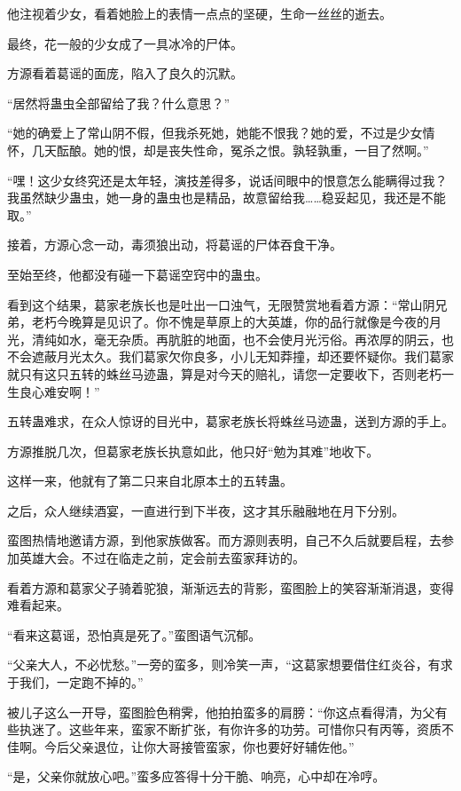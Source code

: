 \begin{this_body}
他注视着少女，看着她脸上的表情一点点的坚硬，生命一丝丝的逝去。

最终，花一般的少女成了一具冰冷的尸体。

方源看着葛谣的面庞，陷入了良久的沉默。

“居然将蛊虫全部留给了我？什么意思？”

“她的确爱上了常山阴不假，但我杀死她，她能不恨我？她的爱，不过是少女情怀，几天酝酿。她的恨，却是丧失性命，冤杀之恨。孰轻孰重，一目了然啊。”

“嘿！这少女终究还是太年轻，演技差得多，说话间眼中的恨意怎么能瞒得过我？我虽然缺少蛊虫，她一身的蛊虫也是精品，故意留给我……稳妥起见，我还是不能取。”

接着，方源心念一动，毒须狼出动，将葛谣的尸体吞食干净。

至始至终，他都没有碰一下葛谣空窍中的蛊虫。

看到这个结果，葛家老族长也是吐出一口浊气，无限赞赏地看着方源：“常山阴兄弟，老朽今晚算是见识了。你不愧是草原上的大英雄，你的品行就像是今夜的月光，清纯如水，毫无杂质。再肮脏的地面，也不会使月光污俗。再浓厚的阴云，也不会遮蔽月光太久。我们葛家欠你良多，小儿无知莽撞，却还要怀疑你。我们葛家就只有这只五转的蛛丝马迹蛊，算是对今天的赔礼，请您一定要收下，否则老朽一生良心难安啊！”

五转蛊难求，在众人惊讶的目光中，葛家老族长将蛛丝马迹蛊，送到方源的手上。

方源推脱几次，但葛家老族长执意如此，他只好“勉为其难”地收下。

这样一来，他就有了第二只来自北原本土的五转蛊。

之后，众人继续酒宴，一直进行到下半夜，这才其乐融融地在月下分别。

蛮图热情地邀请方源，到他家族做客。而方源则表明，自己不久后就要启程，去参加英雄大会。不过在临走之前，定会前去蛮家拜访的。

看着方源和葛家父子骑着驼狼，渐渐远去的背影，蛮图脸上的笑容渐渐消退，变得难看起来。

“看来这葛谣，恐怕真是死了。”蛮图语气沉郁。

“父亲大人，不必忧愁。”一旁的蛮多，则冷笑一声，“这葛家想要借住红炎谷，有求于我们，一定跑不掉的。”

被儿子这么一开导，蛮图脸色稍霁，他拍拍蛮多的肩膀：“你这点看得清，为父有些执迷了。这些年来，蛮家不断扩张，有你许多的功劳。可惜你只有丙等，资质不佳啊。今后父亲退位，让你大哥接管蛮家，你也要好好辅佐他。”

“是，父亲你就放心吧。”蛮多应答得十分干脆、响亮，心中却在冷哼。


\end{this_body}
